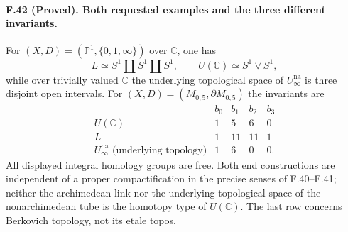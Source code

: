 \paragraph{F.42 (Proved). Both requested examples and the three different invariants.}
For $(X,D)=(\mathbb P^1,\{0,1,\infty\})$ over $\mathbb C$, one has
\[
 L\simeq S^1\amalg S^1\amalg S^1,\qquad
 U(\mathbb C)\simeq S^1\vee S^1,
\]
while over trivially valued $\mathbb C$ the underlying topological space
of $U_\infty^{\mathrm{na}}$ is three disjoint open intervals. For
$(X,D)=(\overline M_{0,5},\partial\overline M_{0,5})$ the invariants are
\[
\begin{array}{c|rrrr}
 &b_0&b_1&b_2&b_3\\\hline
 U(\mathbb C)&1&5&6&0\\
 L&1&11&11&1\\
 U_\infty^{\mathrm{na}}\text{ (underlying topology)}&1&6&0&0.
\end{array}
\]
All displayed integral homology groups are free. Both end constructions
are independent of a proper compactification in the precise senses of
F.40--F.41; neither the archimedean link nor the underlying topological
space of the nonarchimedean tube is the homotopy type of $U(\mathbb C)$.
The last row concerns Berkovich topology, not its etale topos.

